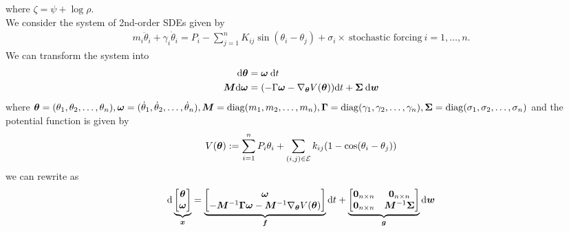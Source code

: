 \documentclass[11pt,twoside,a4paper]{article}
\begin{document}
 where $\zeta = \psi + \log \rho $.
\\ 
We consider the system of 2nd-order SDEs given by
\begin{align*}
m_i\ddot{\theta}_i
    +  \gamma_i \dot{\theta}_i = 
P_i - \sum_{j=1}^{n} K_{ij} \sin(\theta_i-\theta_j)+ \sigma_i \times \:\text{stochastic forcing}\: i=1,\dots,n.
\end{align*}
We can transform the system into 
\begin{align} \label{ODEsystem}
    {\rm{d}} {\bm{\theta}} &= {\bm{\omega}} \: {\rm{d}} t \nonumber \\ 
   {\bm{M}} {\rm{d}} {\bm{\omega}} & = (-\Gamma {\bm{\omega}}-\nabla_{{\bm{\theta}}} V({\bm{\theta}})) {\rm{d}} t + {\bm{\Sigma}} \: {\rm{d}} {\bm{w}}
\end{align}
where ${\bm{\theta}}=(\theta_1,\theta_2,\dots,\theta_n), {\bm{\omega}}=(\dot{\theta}_1,\dot{\theta}_2,\dots,\dot{\theta}_n), {\bm{M}} = {\rm{diag}}(m_1,m_2,\dots,m_n), \bm{\Gamma}= {\rm{diag}}(\gamma_1,\gamma_2,\dots,\gamma_n ),{\bm{\Sigma}} = {\rm{diag}}(\sigma_1,\sigma_2,\dots,\sigma_n)$ and the potential function is given by 
\begin{align}
    V({\bm{\theta}}):= \sum_{i=1}^{n} P_i \theta_i + \sum_{(i,j)\in \mathcal{E}}k_{ij}(1-\cos(\theta_i-\theta_j))
\end{align}
we can rewrite as 
\begin{align}
    {\rm{d}} \underbrace{\begin{bmatrix}
    {\bm{\theta}} \\ {\bm{\omega}} 
    \end{bmatrix}}_{{\bm{x}}}
    = \underbrace{\begin{bmatrix}
    {\bm{\omega}}  \\ 
 -{\bm{M}}^{-1}\bm{\Gamma} {\bm{\omega}} - {\bm{M}}^{-1} \nabla_{{\bm{\theta}}} V({\bm{\theta}})
    \end{bmatrix}}_{\bm{f}} {\rm{d}} t + 
    \underbrace{\begin{bmatrix}
    \bm{0}_{n\times n}  &  \bm{0}_{n\times n}  \\ 
   \bm{0}_{n\times n}  &\bm M^{-1}{\bm{\Sigma}}  
    \end{bmatrix}}_{\bm{g}}
    {\rm{d}} \bm{w}
    \end{align}
\end{document}
